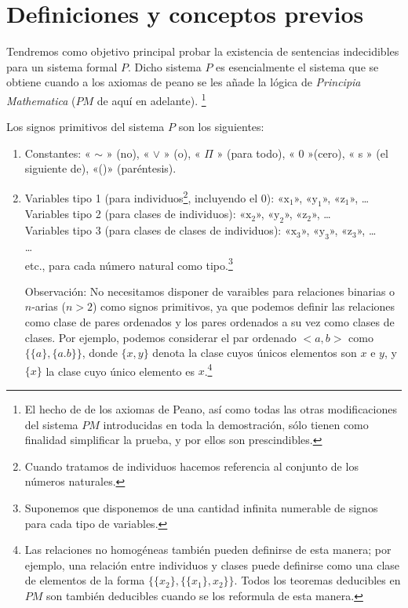 \section{Definiciones y conceptos previos}
Tendremos como objetivo principal probar la existencia de sentencias indecidibles para un sistema formal $P$. Dicho sistema $P$ es
esencialmente el sistema que se obtiene cuando a los axiomas de peano se les añade la lógica de \textit{Principia Mathematica} ($PM$ de aquí en adelante).
\footnote{El hecho de de los axiomas de Peano, así como todas las otras modificaciones del sistema $PM$ introducidas en toda la demostración, sólo 
tienen como finalidad simplificar la prueba, y por ellos son prescindibles.}

Los signos primitivos del sistema $P$ son los siguientes:
\begin{enumerate}
    \item Constantes: « $\sim$ » (no), « $\vee$ » (o), « $\Pi$ » (para todo), « $0$ »(cero), « s » (el siguiente de), «()» (paréntesis).
    \item Variables tipo 1 (para individuos\footnote{Cuando tratamos de individuos hacemos referencia al conjunto de los números naturales.}, 
            incluyendo el 0):  «$\text{x}_1$», «$\text{y}_1$», «$\text{z}_1$», \dots \\
          Variables tipo 2 (para clases de individuos): «$\text{x}_2$», «$\text{y}_2$», «$\text{z}_2$», \dots \\
          Variables tipo 3 (para clases de clases de individuos): «$\text{x}_3$», «$\text{y}_3$», «$\text{z}_3$», \dots \\
          \dots \\
          etc., para cada número natural como tipo.\footnote{Suponemos que disponemos de una cantidad infinita numerable de signos para cada tipo de variables.}
\end{enumerate}
\begin{itemize}
    \item[Observación:] No necesitamos disponer de varaibles para relaciones binarias o $n$-arias ($n>2$) como signos primitivos, ya que podemos definir
                        las relaciones como clase de pares ordenados y los pares ordenados a su vez como clases de clases. Por ejemplo, podemos considerar
                        el par ordenado $<a,b>$ como $\{\{a\}, \{a.b\}\}$, donde $\{x,y\}$ denota la clase cuyos únicos elementos son $x$ e $y$, y $\{x\}$ 
                        la clase cuyo único elemento es $x$.\footnote{Las relaciones no homogéneas también pueden definirse de esta manera; por ejemplo, una
                        relación entre individuos y clases puede definirse como una clase de elementos de la forma $\{\{x_2\}, \{\{x_1\},x_2\}\}$. Todos los 
                        teoremas deducibles en $PM$ son también deducibles cuando se los reformula de esta manera.}
\end{itemize}
                           
